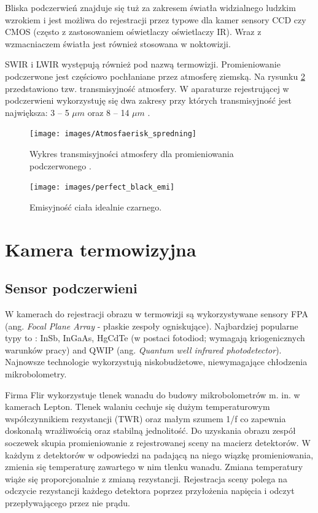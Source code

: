 Bliska podczerwień znajduje się tuż za zakresem światła widzialnego ludzkim wzrokiem i jest możliwa do rejestracji przez typowe dla kamer sensory CCD czy CMOS (często z zastosowaniem oświetlaczy oświetlaczy IR). Wraz z wzmacniaczem światła jest również stosowana w noktowizji.

SWIR i LWIR występują również pod nazwą termowizji. Promieniowanie podczerwone jest częściowo pochłaniane przez atmosferę ziemską. Na rysunku \ref{fig:atmosfera_int} przedstawiono tzw. transmisyjność atmosfery. W aparaturze rejestrującej w podczerwieni wykorzystuję się dwa zakresy przy których transmisyjność jest największa: 3 -- 5 $\mu m$ oraz 8 -- 14 $\mu m$ 
\cite{niklaus2007mems}. 

\begin{figure}
\centering
\texttt{[image: images/Atmosfaerisk\_spredning]}
\caption[Wykres transmisyjności atmosfery dla promieniowania podczerwonego ]{Wykres transmisyjności atmosfery dla promieniowania podczerwonego \cite{wiki:infrared}.}
\label{fig:perfect_black}
\end{figure}

\begin{figure}
\centering
\texttt{[image: images/perfect\_black\_emi]}
\caption[Emisyjność ciała idealnie czarnego]{Emisyjność ciała idealnie czarnego.}
\label{fig:atmosfera_int}
\end{figure}


\section{Kamera termowizyjna}

\subsection{Sensor podczerwieni}
W kamerach do rejestracji obrazu w termowizji są wykorzystywane sensory FPA (ang. \textit{Focal Plane Array}  - płaskie zespoły ogniskujące). Najbardziej popularne typy to : InSb, InGaAs, HgCdTe (w postaci fotodiod; wymagają kriogenicznych warunków pracy) and QWIP (ang. \textit{ Quantum well infrared photodetector}). Najnowsze technologie wykorzystują niskobudżetowe, niewymagające chłodzenia mikrobolometry. 

Firma Flir wykorzystuje tlenek wanadu do budowy mikrobolometrów m. in. w kamerach Lepton. Tlenek walaniu cechuje się dużym temperaturowym współczynnikiem rezystancji (TWR) oraz małym szumem 1/f co zapewnia doskonałą wrażliwością oraz stabilną jednolitość. Do uzyskania obrazu zespół soczewek skupia promieniowanie z rejestrowanej sceny na macierz detektorów. W każdym z detektorów w odpowiedzi na padającą na niego wiązkę promieniowania, zmienia się temperaturę zawartego w nim tlenku wanadu. Zmiana temperatury wiąże się proporcjonalnie z zmianą rezystancji. Rejestracja sceny polega na odczycie rezystancji każdego detektora poprzez przyłożenia napięcia i odczyt przepływającego przez nie prądu. \cite{flir:lepton} 

